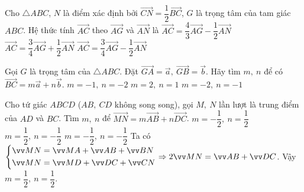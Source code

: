 \begin{ex}%
	Cho $\triangle ABC$, $N$ là điểm xác định bởi $\vec{CN}=\dfrac{1}{2}\vec{BC}$, $G$ là trọng tâm của tam giác $ABC$. Hệ thức tính $\vec{AC}$ theo $\vec{AG}$ và $\vec{AN}$ là
	{$ \vec{AC}=\dfrac{4}{3}\vec{AG}-\dfrac{1}{2}\vec{AN}$}
	{\True $ \vec{AC}=\dfrac{3}{4}\vec{AG}+\dfrac{1}{2}\vec{AN}$}
	{$ \vec{AC}=\dfrac{3}{4}\vec{AG}-\dfrac{1}{2}\vec{AN} $}
\end{ex}

\begin{ex}%
	Gọi $G$ là trọng tâm của $\triangle ABC$. Đặt $\vec{GA}=\vec{a},\ \vec{GB}=\vec{b}$. Hãy tìm $m, \ n$ để có $\vec{BC}=m\vec{a}+n\vec{b}$.
	{\True $m=-1, \ n=-2$}
	{$m=2, \ n=1$}
	{$m=-2, \ n=-1$}
\end{ex}

\begin{ex}%
	Cho tứ giác $ABCD$ ($AB, \ CD$ không song song), gọi $M, \ N$ lần lượt là trung điểm của $AD$ và $BC$. Tìm $m, \ n$ để $\vec{MN}=m\vec{AB}+n\vec{DC}$.
	{$m=-\dfrac{1}{2}, \ n=\dfrac{1}{2}$}
	{$m=\dfrac{1}{2}, \ n=-\dfrac{1}{2}$}
	{$m=-\dfrac{1}{2}, \ n=-\dfrac{1}{2}$}
	\loigiai
	{Ta có $\heva{&\vec{MN}=\vec{MA}+\vec{AB}+\vec{BN}\\&\vec{MN}=\vec{MD}+\vec{DC}+\vec{CN}} \Rightarrow 2\vec{MN}=\vec{AB}+\vec{DC}$.
		Vậy $m=\dfrac{1}{2}, \ n=\dfrac{1}{2}$.}
\end{ex}

